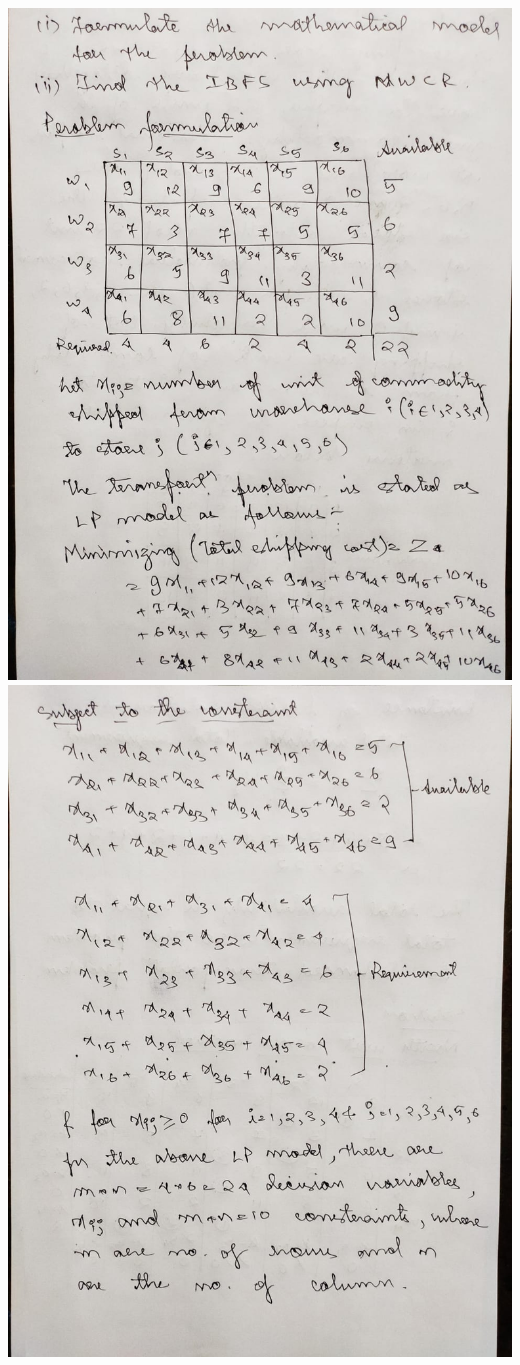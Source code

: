 \documentclass[12pt, letterpaper, twoside]{book}
\begin{document}
\includegraphics[width=\paperwidth, height=\paperheight]{Page8}
\includegraphics[width=\paperwidth, height=\paperheight]{Page9}
\end{document}
